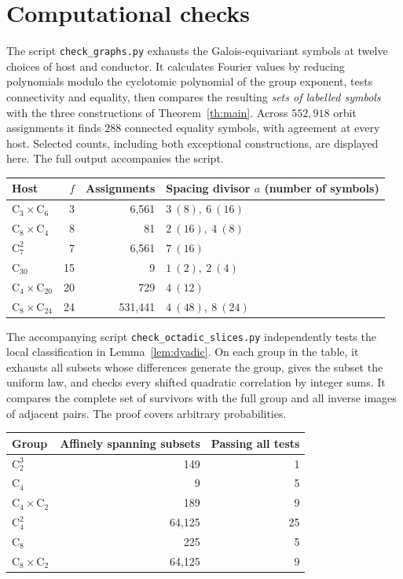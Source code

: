 \documentclass[11pt,letterpaper]{article}
\newcommand{\Cyc}{\mathrm C}
\begin{document}
\section{Computational checks}
The script \texttt{check\_graphs.py} exhausts the Galois-equivariant symbols at twelve choices of host and conductor. It calculates Fourier values by reducing polynomials modulo the cyclotomic polynomial of the group exponent, tests connectivity and equality, then compares the resulting \emph{sets of labelled symbols} with the three constructions of Theorem~\ref{th:main}. Across $552{,}918$ orbit assignments it finds $288$ connected equality symbols, with agreement at every host. Selected counts, including both exceptional constructions, are displayed here. The full output accompanies the script.
\begin{center}
\begin{tabular}{lrrl}
\toprule
Host & $f$ & Assignments & Spacing divisor $a$ (number of symbols)\\
\midrule
$\Cyc_3\times\Cyc_6$ & 3 & 6,561 & $3\ (8),\ 6\ (16)$\\
$\Cyc_8\times\Cyc_4$ & 8 & 81 & $2\ (16),\ 4\ (8)$\\
$\Cyc_7^2$ & 7 & 6,561 & $7\ (16)$\\
$\Cyc_{30}$ & 15 & 9 & $1\ (2),\ 2\ (4)$\\
$\Cyc_4\times\Cyc_{20}$ & 20 & 729 & $4\ (12)$\\
$\Cyc_8\times\Cyc_{24}$ & 24 & 531,441 & $4\ (48),\ 8\ (24)$\\
\bottomrule
\end{tabular}
\end{center}

The accompanying script \texttt{check\_octadic\_slices.py} independently tests the local classification in Lemma~\ref{lem:dyadic}. On each group in the table, it exhausts all subsets whose differences generate the group, gives the subset the uniform law, and checks every shifted quadratic correlation by integer sums. It compares the complete set of survivors with the full group and all inverse images of adjacent pairs. The proof covers arbitrary probabilities.
\begin{center}
\begin{tabular}{lrr}
\toprule
Group & Affinely spanning subsets & Passing all tests\\
\midrule
$\Cyc_2^3$ &149&1\\
$\Cyc_4$ &9&5\\
$\Cyc_4\times\Cyc_2$ &189&9\\
$\Cyc_4^2$ &64,125&25\\
$\Cyc_8$ &225&5\\
$\Cyc_8\times\Cyc_2$ &64,125&9\\
\bottomrule
\end{tabular}
\end{center}
\end{document}
